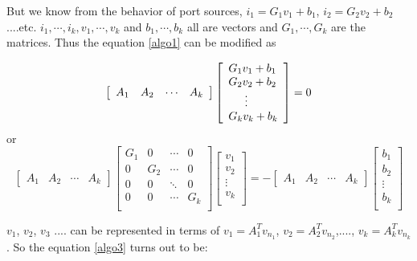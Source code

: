 \documentclass[12pt,psfig,a4]{article}
\begin{document}
But we know from the behavior of port sources, $i_{1} = G_{1}v_{1} + b_{1}$, $i_{2} = G_{2}v_{2} +
b_{2}$ ....etc. $ i_{1},\cdots ,i_{k}  ,  v_{1},\cdots ,v_{k} $ and $ b_{1},\cdots ,b_{k} $ all are 
vectors and  $ G_{1}, \cdots ,G_{k} $ are the matrices. Thus the equation \ref{algo1} can be modified as

\begin{equation}
\left[\begin{array}{llll}
A_{1} & A_{2} & {\cdots} & A_{k}
\end{array}\right]
\left[\begin{array}{l}
G_{1}v_{1} + b_{1}\\
G_{2}v_{2} + b_{2}\\
\hspace{.2in}{\vdots}\\
G_{k}v_{k} + b_{k}\\
\end{array}\right]
= 0
\label{algo2}
\end{equation}
or
\begin{equation}
\left[\begin{array}{llll}
A_{1} & A_{2} & {\cdots} & A_{k}
\end{array}\right]
\left[\begin{array}{llll}
G_{1} & 0 & {\cdots} & 0\\ 
0  & G_{2} & {\cdots} &  0\\ 
0 & 0 & {\ddots} & 0\\ 
0 & 0 & {\cdots} & G_{k}\\ 
\end{array}\right]
\left[\begin{array}{l}
v_{1}\\
v_{2}\\ 
{\vdots}\\
v_{k}\\
\end{array}\right]
= -
\left[\begin{array}{llll}  
A_{1} & A_{2} & {\cdots} & A_{k}
\end{array}\right]
\left[\begin{array}{l}
b_{1}\\
b_{2}\\
{\vdots}\\
b_{k}\\
\end{array}\right]
\label{algo3}
\end{equation}

$v_{1}$, $v_{2}$, $v_{3}$ .... can be represented in terms of $v_{1}=A_{1}^{T}v_{n_{1}}$,
$v_{2}=A_{2}^{T}v_{n_{2}}$,...., $v_{k}=A_{k}^{T}v_{n_{k}}$. So the equation \ref{algo3} turns 
out to be:
\end{document}
